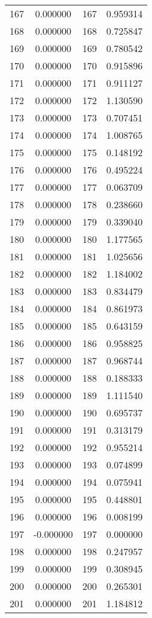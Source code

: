\documentclass[12pt]{article}
\begin{document}
\begin{longtable}{@{}cccc@{}}
167 & 0.000000 & 167 & 0.959314 \\
168 & 0.000000 & 168 & 0.725847 \\
169 & 0.000000 & 169 & 0.780542 \\
170 & 0.000000 & 170 & 0.915896 \\
171 & 0.000000 & 171 & 0.911127 \\
172 & 0.000000 & 172 & 1.130590 \\
173 & 0.000000 & 173 & 0.707451 \\
174 & 0.000000 & 174 & 1.008765 \\
175 & 0.000000 & 175 & 0.148192 \\
176 & 0.000000 & 176 & 0.495224 \\
177 & 0.000000 & 177 & 0.063709 \\
178 & 0.000000 & 178 & 0.238660 \\
179 & 0.000000 & 179 & 0.339040 \\
180 & 0.000000 & 180 & 1.177565 \\
181 & 0.000000 & 181 & 1.025656 \\
182 & 0.000000 & 182 & 1.184002 \\
183 & 0.000000 & 183 & 0.834479 \\
184 & 0.000000 & 184 & 0.861973 \\
185 & 0.000000 & 185 & 0.643159 \\
186 & 0.000000 & 186 & 0.958825 \\
187 & 0.000000 & 187 & 0.968744 \\
188 & 0.000000 & 188 & 0.188333 \\
189 & 0.000000 & 189 & 1.111540 \\
190 & 0.000000 & 190 & 0.695737 \\
191 & 0.000000 & 191 & 0.313179 \\
192 & 0.000000 & 192 & 0.955214 \\
193 & 0.000000 & 193 & 0.074899 \\
194 & 0.000000 & 194 & 0.075941 \\
195 & 0.000000 & 195 & 0.448801 \\
196 & 0.000000 & 196 & 0.008199 \\
197 & -0.000000 & 197 & 0.000000 \\
198 & 0.000000 & 198 & 0.247957 \\
199 & 0.000000 & 199 & 0.308945 \\
200 & 0.000000 & 200 & 0.265301 \\
201 & 0.000000 & 201 & 1.184812 \\

\end{longtable}
\end{document}
